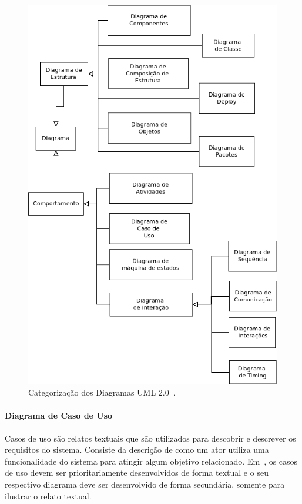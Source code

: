 \begin{figure}
	\centering
	\includegraphics[scale=0.75]{images/categorias-diagramas.png}
	\caption{Categorização dos Diagramas UML 2.0~\cite{fowler04}.}
	\label{fig:categorias-diagramas}
\end{figure}

\paragraph{Diagrama de Caso de Uso}

Casos de uso são relatos textuais que são utilizados para descobrir e descrever os requisitos do sistema. Consiste da descrição de como um ator utiliza uma funcionalidade do sistema para atingir algum objetivo relacionado. Em~\cite{larman08}, os casos de uso devem ser prioritariamente desenvolvidos de forma textual e o seu respectivo diagrama deve ser desenvolvido de forma secundária, somente para ilustrar o relato textual.

